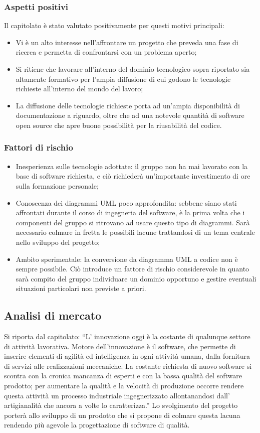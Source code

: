 \documentclass[../StudioDiFattibilita.tex]{subfiles}
\begin{document}
			\subsubsection{Aspetti positivi}
			Il capitolato è stato valutato positivamente per questi motivi principali:
			\begin{itemize}
				\item Vi è un alto interesse nell'affrontare un progetto che preveda una fase di ricerca e permetta di
				confrontarsi con un problema aperto;
				\item Si ritiene che lavorare all'interno del dominio tecnologico sopra riportato sia altamente formativo per
				l'ampia diffusione di cui godono le tecnologie richieste all'interno del mondo del lavoro;
				\item La diffusione delle tecnologie richieste porta ad un'ampia disponibilità di documentazione a riguardo, oltre
				che ad una notevole quantità di software open source che apre buone possibilità per la riusabilità del codice.
			\end{itemize}
			\subsubsection{Fattori di rischio}
			\begin{itemize}
				\item Inesperienza sulle tecnologie adottate: il gruppo non ha mai lavorato con la base di software richiesta, e
				ciò richiederà un’importante investimento di ore sulla formazione personale;
				\item Conoscenza dei diagrammi UML poco approfondita: sebbene siano stati affrontati durante il corso di
				ingegneria del software, è la prima volta che i componenti del gruppo si ritrovano ad usare questo tipo di
				diagrammi. Sarà necessario colmare in fretta le possibili lacune trattandosi di un tema centrale nello sviluppo
				del progetto;
				\item Ambito sperimentale: la conversione da diagramma UML a codice non è sempre possibile. Ciò introduce
				un fattore di rischio considerevole in quanto sarà compito del gruppo individuare un dominio opportuno e
				gestire eventuali situazioni particolari non previste a priori.
			\end{itemize}
		\subsection{Analisi di mercato}
		Si riporta dal capitolato:
		“L’ innovazione oggi è la costante di qualunque settore di attività lavorativa. Motore dell’innovazione è il software, che
		permette di inserire elementi di agilità ed intelligenza in ogni attività umana, dalla fornitura di servizi alle realizzazioni
		meccaniche. La costante richiesta di nuovo software si scontra con la cronica mancanza di esperti e con la bassa qualità del
		software prodotto; per aumentare la qualità e la velocità di produzione occorre rendere questa attività un processo
		industriale ingegnerizzato allontanandosi dall’ artigianalità che ancora a volte lo caratterizza.”
		Lo svolgimento del progetto porterà allo sviluppo di un prodotto che si propone di colmare questa lacuna rendendo più
		agevole la progettazione di software di qualità.
\end{document}
